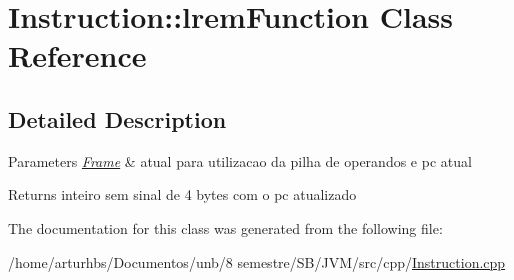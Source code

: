 \hypertarget{classInstruction_1_1lremFunction}{}\section{Instruction\+:\+:lrem\+Function Class Reference}
\label{classInstruction_1_1lremFunction}


\subsection{Detailed Description}

\begin{DoxyParams}{Parameters}
{\em \hyperlink{classFrame}{Frame}} & atual para utilizacao da pilha de operandos e pc atual \\
\hline
\end{DoxyParams}
\begin{DoxyReturn}{Returns}
inteiro sem sinal de 4 bytes com o pc atualizado 
\end{DoxyReturn}


The documentation for this class was generated from the following file\+:\begin{DoxyCompactItemize}
\item 
/home/arturhbs/\+Documentos/unb/8 semestre/\+S\+B/\+J\+V\+M/src/cpp/\hyperlink{Instruction_8cpp}{Instruction.\+cpp}\end{DoxyCompactItemize}
